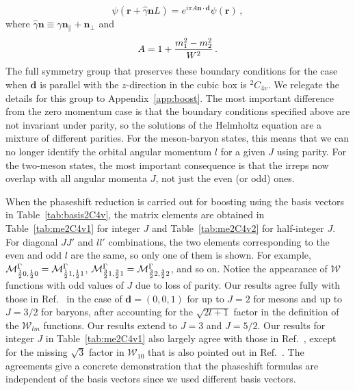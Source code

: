 \documentclass[aps,prd,reprint,showpacs,floatfix,longbibliography,,superscriptaddress]{revtex4-1}
\def\mw{\mathcal{W}}
\def\beq{\begin{equation}}
\def\eeq{\end{equation}}
\begin{document}
\begin{widetext}
\beq
\psi(\bm r+\hat\gamma\bm n L) = e^{i\pi A \bm n \cdot \bm d} \psi(\bm r) \,,
\eeq
where $\hat\gamma\bm n\equiv \gamma \bm n_\parallel + \bm n_\perp$ and
\begin{equation}
A=1+ {m_1^2-m_2^2 \over W^2}\,.
\end{equation}
The full symmetry group that preserves these boundary conditions for the case when $\bm d$ is
parallel with the $z$-direction in the cubic box is $^2C_{4v}$. 
We relegate the details for this group to Appendix~\ref{app:boost}.
The most important difference from the zero momentum case is that the boundary conditions specified
above are not invariant under parity, so the solutions of the Helmholtz equation are a mixture 
of different parities. For the meson-baryon states, this means that we can no longer identify
the orbital angular momentum $l$ for a given $J$ using parity. For the two-meson states, the
most important consequence is that the irreps now overlap with all angular momenta $J$, not just
the even (or odd) ones.

When the phaseshift  reduction is carried out for boosting using the basis vectors in Table~\ref{tab:basis2C4v},
the matrix elements are obtained in Table~\ref{tab:me2C4v1} for integer $J$ and Table~\ref{tab:me2C4v2} for half-integer $J$. 
For diagonal $JJ'$ and $ll'$ combinations, the two elements corresponding to the even and odd $l$ are  the same, so only one of them is shown. 
For example, $\mathcal{M}^\Gamma_{{1\over 2}0, {1\over 2}0}=\mathcal{M}^\Gamma_{{1\over 2}1, {1\over 2}1}$, 
$\mathcal{M}^\Gamma_{{3\over 2}1, {3\over 2}1}=\mathcal{M}^\Gamma_{{3\over 2}2, {3\over 2}2}$, and so on.
Notice the appearance of $\mw$ functions with odd values of $J$ due to loss of parity.
Our results agree fully with those in Ref.~\cite{Gockeler:2012yj} in the case of $\bm d=(0,0,1)$ for up to $J=2$ 
for mesons and up to $J=3/2$ for baryons, after accounting for the $\sqrt{2l+1}$ factor in the definition of the 
$\mw_{lm}$ functions. Our results extend to $J=3$ and $J=5/2$. Our results for integer $J$ in Table~\ref{tab:me2C4v1}  also largely agree with those in Ref.~\cite{Fu:2011xz}, except for the missing $\sqrt{3}$ factor in $\mw_{10}$ that is 
also pointed out in Ref.~\cite{Leskovec:2012gb}. The agreements give a concrete demonstration 
that the phaseshift formulas are independent of the basis vectors since we used different basis vectors. 


\end{widetext}
\end{document}
